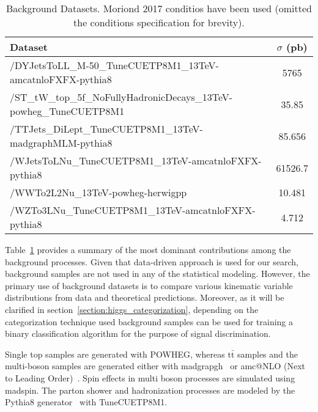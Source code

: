 \begin{table}[htb]
    \caption{Background Datasets. Moriond 2017 conditios have been used (omitted the conditions specification for brevity).}
    \label{table:higgs_data_backgrounddatasets}
    \begin{center}
        \begin{tabular}{ l  c}
            \hline
            Dataset & $\sigma$ (pb)\\
            \hline
            /DYJetsToLL\_M-50\_TuneCUETP8M1\_13TeV-amcatnloFXFX-pythia8 & 5765\\
            /ST\_tW\_top\_5f\_NoFullyHadronicDecays\_13TeV-powheg\_TuneCUETP8M1 & 35.85\\
            /TTJets\_DiLept\_TuneCUETP8M1\_13TeV-madgraphMLM-pythia8 & 85.656\\
            /WJetsToLNu\_TuneCUETP8M1\_13TeV-amcatnloFXFX-pythia8 & 61526.7\\
            /WWTo2L2Nu\_13TeV-powheg-herwigpp & 10.481\\
            /WZTo3LNu\_TuneCUETP8M1\_13TeV-amcatnloFXFX-pythia8 & 4.712\\
            \hline
        \end{tabular}
    \end{center}
\end{table}

Table~\ref{table:higgs_data_backgrounddatasets} provides a summary of the most dominant contributions among the background processes. Given that data-driven approach is used for our search, background samples are not used in any of the statistical modeling. However, the primary use of background datasets is to compare various kinematic variable distributions from data and theoretical predictions. Moreover, as it will be clarified in section~\ref{section:higgs_categorization}, depending on the categorization technique used background samples can be used for training a binary classification algorithm for the purpose of signal discrimination.

Single top samples are generated with {\sc POWHEG}, whereas $\mathrm{t\bar{t}}$ samples and the multi-boson samples are generated either with {\sc madgrapgh}~\cite{Alwall:2011uj} or {\sc amc@NLO} (Next to Leading Order)~\cite{amcatnlo}. Spin effects in multi boson processes are simulated using madspin. The parton shower and hadronization processes are modeled by the {\sc Pythia8} generator~\cite{Sjostrand:2007gs} with TuneCUETP8M1.


